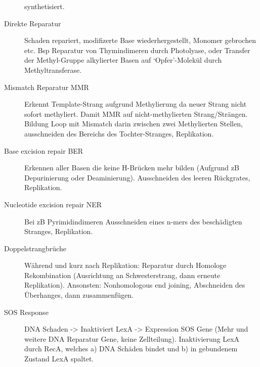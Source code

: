 \documentclass[a4paper,twocolumn,usegeometry,english,fontsize=5,DIV=28]{scrartcl}
\begin{document}
\begin{description}
		synthetisiert.
	\item[Direkte Reparatur] Schaden repariert, modifizerte Base
		wiederhergestellt, Monomer gebrochen etc. Bsp Reparatur von
		Thymindimeren durch Photolyase, oder Transfer der Methyl-Gruppe
		alkylierter Basen auf `Opfer'-Molekül durch Methyltransferase.
	\item[Mismatch Reparatur MMR] Erkennt Template-Strang aufgrund
		Methylierung da neuer Strang nicht sofort methyliert. Damit MMR
		auf nicht-methylierten Strang/Strängen. Bildung Loop mit
		Mismatch darin zwischen zwei Methylierten Stellen, ausschneiden
		des Bereichs des Tochter-Stranges, Replikation.
	\item[Base excision repair BER] Erkennen aller Basen die keine
		H-Brücken mehr bilden (Aufgrund zB Depurinierung oder
		Deaminierung). Ausschneiden des leeren Rückgrates, Replikation.
	\item[Nucleotide excision repair NER] Bei zB Pyrimidindimeren
		Ausschneiden eines n-mers des beschädigten Stranges,
		Replikation.
	\item[Doppelstrangbrüche] Während und kurz nach Replikation: Reparatur
		durch Homologe Rekombination (Ausrichtung an Schwesterstrang,
		dann erneute Replikation). Ansonsten: Nonhomologous end joining,
		Abschneiden des Überhanges, dann zusammenfügen.
	\item[SOS Response] DNA Schaden -> Inaktiviert LexA -> Expression SOS
		Gene (Mehr und weitere DNA Reparatur Gene, keine Zellteilung).
		Inaktivierung LexA durch RecA, welches a) DNA Schäden bindet
		und b) in gebundenem Zustand LexA spaltet.
\end{description}
\end{document}

